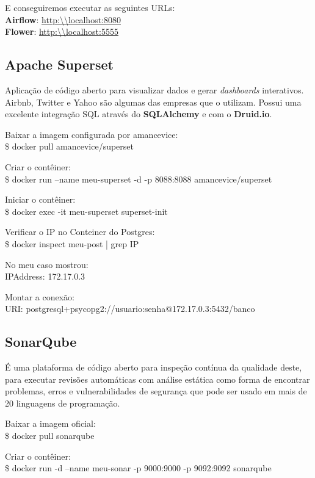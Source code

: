 \documentclass[a4paper,11pt]{article}
\begin{document}
E conseguiremos executar as seguintes URLs: \\
\textbf{Airflow}: \url{http:\\localhost:8080} \\
\textbf{Flower}: \url{http:\\localhost:5555}

\subsection{Apache Superset}
Aplicação de código aberto para visualizar dados e gerar \textit{dashboards} interativos. Airbnb, Twitter e Yahoo são algumas das empresas que o utilizam. Possui uma excelente integração SQL através do \textbf{SQLAlchemy} e com o \textbf{Druid.io}.

Baixar a imagem configurada por amancevice: \\
{\ttfamily\$ docker pull amancevice/superset}

Criar o contêiner: \\
{\ttfamily\$ docker run --name meu-superset -d -p 8088:8088 amancevice/superset}

Iniciar o contêiner: \\
{\ttfamily\$ docker exec -it meu-superset superset-init}

Verificar o IP no Conteiner do Postgres: \\
{\ttfamily\$ docker inspect meu-post | grep IP}

No meu caso mostrou: \\
{\ttfamily IPAddress: 172.17.0.3}

Montar a conexão: \\
{\ttfamily URI: postgresql+psycopg2://usuario:senha@172.17.0.3:5432/banco}

\subsection{SonarQube}
É uma plataforma de código aberto para inspeção contínua da qualidade deste, para executar revisões automáticas com análise estática como forma de encontrar problemas, erros e vulnerabilidades de segurança que pode ser usado em mais de 20 linguagens de programação.

Baixar a imagem oficial: \\
{\ttfamily\$ docker pull sonarqube}

Criar o contêiner: \\
{\ttfamily\$ docker run -d --name meu-sonar -p 9000:9000 -p 9092:9092 sonarqube}
\end{document}
